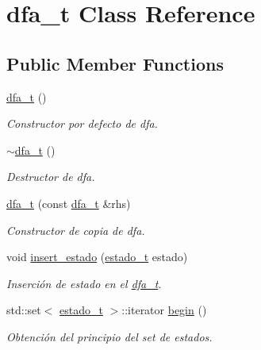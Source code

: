 \hypertarget{classdfa__t}{}\section{dfa\+\_\+t Class Reference}
\label{classdfa__t}
\subsection*{Public Member Functions}
\begin{DoxyCompactItemize}
\item 
\mbox{\label{classdfa__t_ab11cbfa4aa17e7c5b0f3d5f59f646af4}} 
\hyperlink{classdfa__t_ab11cbfa4aa17e7c5b0f3d5f59f646af4}{dfa\+\_\+t} ()
\begin{DoxyCompactList}\small\item\em Constructor por defecto de dfa. \end{DoxyCompactList}\item 
\mbox{\label{classdfa__t_a8adafd883c3efb0990726dd5e1ee5f56}} 
\hyperlink{classdfa__t_a8adafd883c3efb0990726dd5e1ee5f56}{$\sim$dfa\+\_\+t} ()
\begin{DoxyCompactList}\small\item\em Destructor de dfa. \end{DoxyCompactList}\item 
\hyperlink{classdfa__t_a3b578828ea13668680017fdc9fad8c86}{dfa\+\_\+t} (const \hyperlink{classdfa__t}{dfa\+\_\+t} \&rhs)
\begin{DoxyCompactList}\small\item\em Constructor de copia de dfa. \end{DoxyCompactList}\item 
void \hyperlink{classdfa__t_a7cd98411f9141b1c68ba84a72f9e63d6}{insert\+\_\+estado} (\hyperlink{classestado__t}{estado\+\_\+t} estado)
\begin{DoxyCompactList}\small\item\em Inserción de estado en el \hyperlink{classdfa__t}{dfa\+\_\+t}. \end{DoxyCompactList}\item 
std\+::set$<$ \hyperlink{classestado__t}{estado\+\_\+t} $>$\+::iterator \hyperlink{classdfa__t_ab8d3e7309b0cf2fe8610edfa8803382a}{begin} ()
\begin{DoxyCompactList}\small\item\em Obtención del principio del set de estados. \end{DoxyCompactList}\item 

\end{DoxyCompactItemize}
